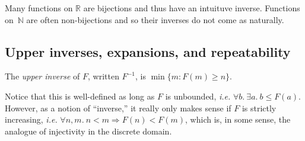 Many functions on $\mathbb{R}$ are bijections and thus have an intuituve inverse.  
Functions on~$\mathbb{N}$ are often non-bijections and so their inverses
do not come as naturally.

\subsection{Upper inverses, expansions, and repeatability}
\begin{defn} \label{defn: inverse}
The \emph{upper inverse} of $F$, written $F^{-1}$, 
is $\min\{m : F(m)\ge n\}$.\end{defn}
Notice that this is well-defined as long as $F$ is unbounded, \emph{i.e.} $\forall b.~\exists a.~ b \leq F(a)$.  However, as a notion of ``inverse,'' it really only makes sense if $F$ is strictly
increasing, \emph{i.e.} $\forall n,m.~n < m \Rightarrow F(n) < F(m)$, which is, in some sense, the analogue of injectivity in the discrete domain.

